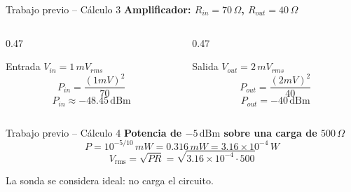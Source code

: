 \documentclass[aspectratio=169]{beamer}
\newcommand{\dBm}{\,\mathrm{dBm}}
\begin{document}
\begin{frame}{Trabajo previo -- Cálculo 3}
\textbf{Amplificador: $R_{in}=70\,\Omega$, $R_{out}=40\,\Omega$}
\begin{columns}[T,onlytextwidth]
\begin{column}{0.47\textwidth}
\begin{block}{Entrada}
$V_{in}=1\,mV_{rms}$
\[
P_{in}=\frac{(1mV)^2}{70}
\]
\[
\boxed{P_{in}\approx-48.45\dBm}
\]
\end{block}
\end{column}
\begin{column}{0.47\textwidth}
\begin{block}{Salida}
$V_{out}=2\,mV_{rms}$
\[
P_{out}=\frac{(2mV)^2}{40}
\]
\[
\boxed{P_{out}=-40\dBm}
\]
\end{block}
\end{column}
\end{columns}
\begin{center}
\end{center}
\end{frame}

\begin{frame}{Trabajo previo -- Cálculo 4}
\textbf{Potencia de $-5\dBm$ sobre una carga de $500\,\Omega$}
\[
P=10^{-5/10}\,mW=0.316\,mW=3.16\times10^{-4}\,W
\]
\[
V_{\mathrm{rms}}=\sqrt{PR}
=\sqrt{3.16\times10^{-4}\cdot500}
\]
\begin{center}
\end{center}
\vfill
\centering
La sonda se considera ideal: no carga el circuito.
\end{frame}
\end{document}
